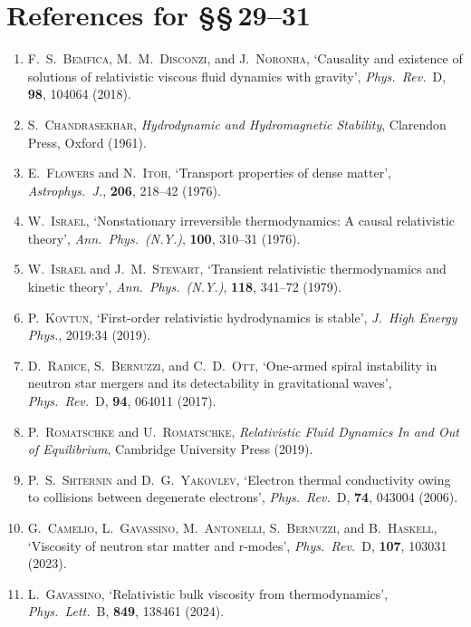 \section*{References for \S\S\,29--31}

\begin{enumerate}
\item F.~S.~\textsc{Bemfica}, M.~M.~\textsc{Disconzi}, and
  J.~\textsc{Noronha}, `Causality and existence of solutions of
  relativistic viscous fluid dynamics with gravity',
  \emph{Phys.\ Rev.}~D, \textbf{98}, 104064 (2018).

\item S.~\textsc{Chandrasekhar}, \emph{Hydrodynamic and
  Hydromagnetic Stability}, Clarendon Press, Oxford (1961).

\item E.~\textsc{Flowers} and N.~\textsc{Itoh}, `Transport properties
  of dense matter', \emph{Astrophys.\ J.}, \textbf{206}, 218--42
  (1976).

\item W.~\textsc{Israel}, `Nonstationary irreversible thermodynamics:
  A causal relativistic theory', \emph{Ann.\ Phys.\ (N.Y.)},
  \textbf{100}, 310--31 (1976).

\item W.~\textsc{Israel} and J.~M.~\textsc{Stewart}, `Transient
  relativistic thermodynamics and kinetic theory',
  \emph{Ann.\ Phys.\ (N.Y.)}, \textbf{118}, 341--72 (1979).

\item P.~\textsc{Kovtun}, `First-order relativistic hydrodynamics is
  stable', \emph{J.\ High Energy Phys.}, 2019:34 (2019).

\item D.~\textsc{Radice}, S.~\textsc{Bernuzzi}, and
  C.~D.~\textsc{Ott}, `One-armed spiral instability in neutron star
  mergers and its detectability in gravitational waves',
  \emph{Phys.\ Rev.}~D, \textbf{94}, 064011 (2017).

\item P.~\textsc{Romatschke} and U.~\textsc{Romatschke},
  \emph{Relativistic Fluid Dynamics In and Out of Equilibrium},
  Cambridge University Press (2019).

\item P.~S.~\textsc{Shternin} and D.~G.~\textsc{Yakovlev}, `Electron
  thermal conductivity owing to collisions between degenerate
  electrons', \emph{Phys.\ Rev.}~D, \textbf{74}, 043004 (2006).

\item G.~\textsc{Camelio}, L.~\textsc{Gavassino}, M.~\textsc{Antonelli},
  S.~\textsc{Bernuzzi}, and B.~\textsc{Haskell}, `Viscosity of neutron
  star matter and r-modes', \emph{Phys.\ Rev.}~D, \textbf{107}, 103031
  (2023).

\item L.~\textsc{Gavassino}, `Relativistic bulk viscosity from
  thermodynamics', \emph{Phys.\ Lett.}~B, \textbf{849}, 138461
  (2024).
\end{enumerate}
